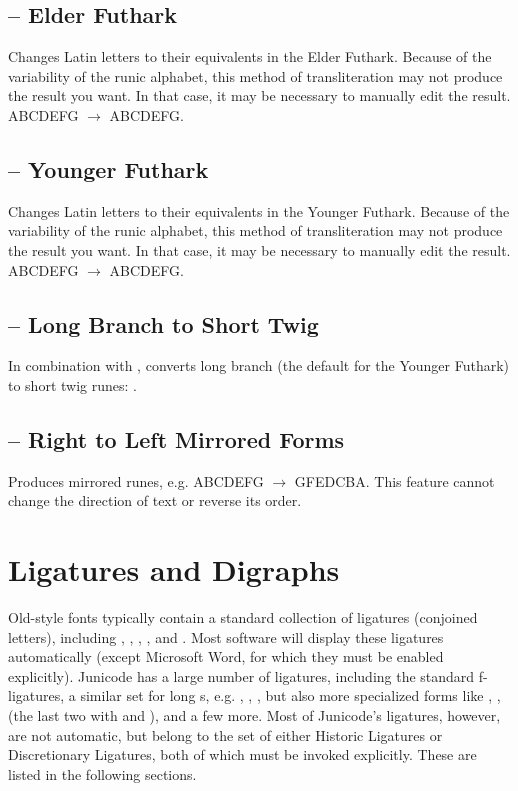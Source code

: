\subsection{ -- Elder
Futhark}
Changes Latin letters to their equivalents in the Elder Futhark. Because of the variability of the runic alphabet, this
method of transliteration may not produce the result you want. In that case, it may be necessary to manually edit the
result. ABCDEFG $\rightarrow $ {ABCDEFG}.

\subsection{ -- Younger
Futhark}
Changes Latin letters to their equivalents in the Younger Futhark. Because of the variability of the runic alphabet,
this method of transliteration may not produce the result you want. In that case, it may be necessary to manually edit
the result. ABCDEFG $\rightarrow $ {ABCDEFG}.

\subsection{ --
Long Branch to Short Twig}
In combination with , converts long branch (the default for the Younger Futhark) to short twig runes:
{}.

\subsection{
-- Right to Left Mirrored Forms}
Produces mirrored runes, e.g. {ABCDEFG $\rightarrow $ GFEDCBA}.
This feature cannot change the direction of text or reverse its order.

\section{Ligatures and Digraphs}

Old-style fonts typically contain a standard collection of ligatures (conjoined letters), including
, , , , and .
Most software will display these ligatures automatically (except
Microsoft Word, for which they must be enabled explicitly). Junicode has a large number of ligatures,
including the standard f-ligatures, a similar set for long s, e.g. , , , but also more
specialized forms like , 
,
(the last two with  and ), and a few more. Most of Junicode’s
ligatures, however, are not automatic, but belong to the set of either Historic Ligatures
or Discretionary Ligatures, both of which must be invoked explicitly. These are listed in the following sections.

